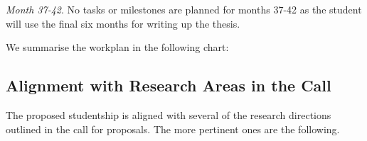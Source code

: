 \documentclass[10pt]{article}
\begin{document}
\textit{Month 37-42}. No tasks or milestones are planned for months 37-42 as the student will use the final six months for writing up the thesis.


We summarise the workplan in the following chart:

\iffalse

\begin{center}
\begin{ganttchart}[hgrid,vgrid]{1}{21}
\gantttitle{year 1}{6}
\gantttitle{year 2}{6}
\gantttitle{year 3}{6}
\gantttitle{year 4}{3}
\ganttnewline
\gantttitle{6 mo}{3}
\gantttitle{12 mo}{3}
\gantttitle{18 mo}{3}
\gantttitle{24 mo}{3}
\gantttitle{30 mo}{3}
\gantttitle{36 mo}{3}
\gantttitle{42 mo}{3}

\ganttnewline

\ganttbar{preparation}{1}{3}

\ganttnewline

\ganttbar{WP 1}{4}{9}
\ganttmilestone{}{6}

\ganttnewline

\ganttbar{WP 2}{10}{15}
\ganttmilestone{}{12}

\ganttnewline

\ganttbar{WP 3}{16}{18}
\ganttmilestone{}{18}

\ganttnewline

\ganttbar{thesis}{19}{21}

\end{ganttchart}
\end{center}

\fi

\subsection*{Alignment with Research Areas in the Call}

The proposed studentship is aligned with several of the research directions outlined in the call for proposals. The more pertinent ones are the following. 
\end{document}
